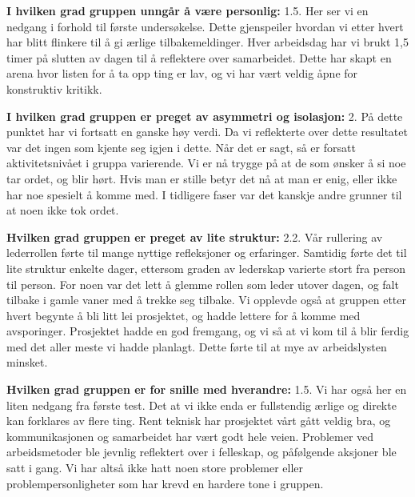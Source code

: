 \noindent \textbf{I hvilken grad gruppen unngår å være personlig:} 1.5.
\newline
\noindent Her ser vi en nedgang i forhold til første undersøkelse. Dette gjenspeiler hvordan vi etter hvert har blitt flinkere til å gi ærlige tilbakemeldinger. Hver arbeidsdag har vi brukt 1,5 timer på slutten av dagen til å reflektere over samarbeidet. 
Dette har skapt en arena hvor listen for å ta opp ting er lav, og vi har vært veldig åpne for konstruktiv kritikk.
\vspace{\secspace}

\noindent \textbf{I hvilken grad gruppen er preget av asymmetri og isolasjon:} 2.
\newline
\noindent På dette punktet har vi fortsatt en ganske høy verdi. Da vi reflekterte over dette resultatet var det ingen som kjente seg igjen i dette. Når det er sagt, så er forsatt aktivitetsnivået i gruppa varierende.
Vi er nå trygge på at de som ønsker å si noe tar ordet, og blir hørt. Hvis man er stille betyr det nå at man er enig, eller ikke har noe spesielt å komme med. I tidligere faser var det kanskje andre grunner til at noen ikke tok ordet. 

\vspace{\secspace}

\noindent \textbf{Hvilken grad gruppen er preget av lite struktur:} 2.2.
\newline
\noindent Vår rullering av lederrollen førte til mange nyttige refleksjoner og erfaringer. 
Samtidig førte det til lite struktur enkelte dager, ettersom graden av lederskap varierte stort fra person til person. For noen var det lett å glemme rollen som leder utover dagen, og falt tilbake i gamle vaner med å trekke seg tilbake. 
Vi opplevde også at gruppen etter hvert begynte å bli litt lei prosjektet, og hadde lettere for å komme med avsporinger.
Prosjektet hadde en god fremgang, og vi så at vi kom til å blir ferdig med det aller meste vi hadde planlagt.
Dette førte til at mye av arbeidslysten minsket.
\vspace{\secspace}

\noindent \textbf{Hvilken grad gruppen er for snille med hverandre:} 1.5.
\newline
\noindent Vi har også her en liten nedgang fra første test. Det at vi ikke enda er fullstendig ærlige og direkte kan forklares av flere ting. 
Rent teknisk har prosjektet vårt gått veldig bra, og kommunikasjonen og samarbeidet har vært godt hele veien. Problemer ved arbeidsmetoder ble jevnlig reflektert over i felleskap, og påfølgende aksjoner ble satt i gang. Vi har altså ikke hatt noen store problemer eller problempersonligheter som har krevd en hardere tone i gruppen. 
\vspace{\secspace}

